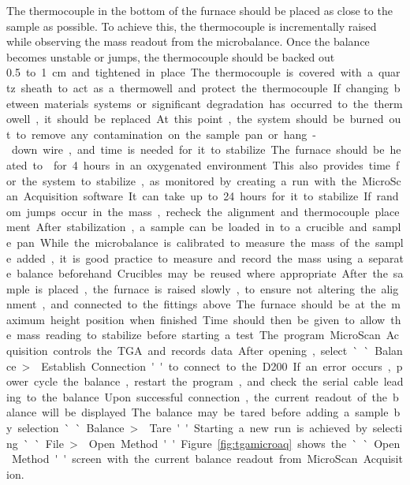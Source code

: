         The thermocouple in the bottom of the furnace should be placed as close to the sample as possible.
        To achieve this, the thermocouple is incrementally raised while observing the mass readout from the microbalance.
        Once the balance becomes unstable or jumps, the thermocouple should be backed out \SI{0.5} to \SI{1}{\centi\meter} and tightened in place.
        The thermocouple is covered with a quartz sheath to act as a thermowell and protect the thermocouple.
        If changing between materials systems or significant degradation has occurred to the thermowell, it should be replaced.

        At this point, the system should be burned out to remove any contamination on the sample pan or hang-down wire, and time is needed for it to stabilize.
        The furnace should be heated to  for 4 hours in an oxygenated environment.
        This also provides time for the system to stabilize, as monitored by creating a run with the MicroScan Acquisition software.
        It can take up to 24 hours for it to stabilize.
        If random jumps occur in the mass, recheck the alignment and thermocouple placement.

        After stabilization, a sample can be loaded in to a crucible and sample pan.
        While the microbalance is calibrated to measure the mass of the sample added, it is good practice to measure and record the mass using a separate balance beforehand.
        Crucibles may be reused where appropriate.
        After the sample is placed, the furnace is raised slowly, to ensure not altering the alignment, and connected to the fittings above.
        The furnace should be at the maximum height position when finished.
        Time should then be given to allow the mass reading to stabilize before starting a test.

        The program MicroScan Acquisition controls the TGA and records data.
        After opening, select ``Balance \textgreater{} Establish Connection'' to connect to the D200.
        If an error occurs, power cycle the balance, restart the program, and check the serial cable leading to the balance.
        Upon successful connection, the current readout of the balance will be displayed.
        The balance may be tared before adding a sample by selection ``Balance \textgreater{} Tare.''
        Starting a new run is achieved by selecting ``File \textgreater{} Open Method.''
        Figure \ref{fig:tgamicroaq} shows the ``Open Method'' screen with the current balance readout from MicroScan Acquisition.

